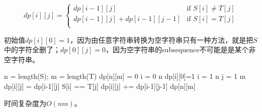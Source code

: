 \documentclass[a4paper,12pt]{article}
\begin{document}
\[
dp[i][j]=
\begin{cases}
dp[i-1][j] & \text{if $S[i]\neq T[j]$}\\
dp[i-1][j]+dp[i-1][j-1] & \text{if $S[i]=T[j]$}\\
\end{cases}
\]

初始值$dp[i][0]=1$，因为由任意字符串转换为空字符串只有一种方法，就是把$S$中的字符全删了；$dp[0][j]=0$，因为空字符串的subsequence不可能是是某个非空字符串。

\begin{codebox}
\li n = length(S); m = length(T)
\li dp[n][m] = 0
\li \For i = 0 \To n
    \Do
\li dp[i][0]=1
    \End
\li \For i = 1 \To n
    \Do
\li \For j = 1 \To m
    \Do
\li dp[i][j] = dp[i-1][j]
\li \If S[i] == T[j]
    \Then
\li dp[i][j] += dp[i-1][j-1]
    \End
    \End
    \End
\li \Return dp[n][m]
\end{codebox}

时间复杂度为$O(nm)$。
\end{document}
